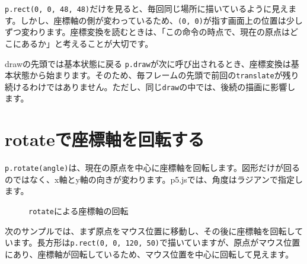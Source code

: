 \texttt{p.rect(0, 0, 48, 48)}だけを見ると、毎回同じ場所に描いているように見えます。しかし、座標軸の側が変わっているため、\texttt{(0, 0)}が指す画面上の位置は少しずつ変わります。座標変換を読むときは、「この命令の時点で、現在の原点はどこにあるか」と考えることが大切です。

\begin{notebox}{drawの先頭では基本状態に戻る}
\texttt{p.draw}が次に呼び出されるとき、座標変換は基本状態から始まります。そのため、毎フレームの先頭で前回の\texttt{translate}が残り続けるわけではありません。ただし、同じ\texttt{draw}の中では、後続の描画に影響します。
\end{notebox}

\section{rotateで座標軸を回転する}

\texttt{p.rotate(angle)}は、現在の原点を中心に座標軸を回転します。図形だけが回るのではなく、x軸とy軸の向きが変わります。p5.jsでは、角度はラジアンで指定します。

\begin{figure}[htbp]
    \centering
    \caption{\texttt{rotate}による座標軸の回転}
    \label{fig:chapter09-rotate-axis}
\end{figure}

次のサンプルでは、まず原点をマウス位置に移動し、その後に座標軸を回転しています。長方形は\texttt{p.rect(0, 0, 120, 50)}で描いていますが、原点がマウス位置にあり、座標軸が回転しているため、マウス位置を中心に回転して見えます。

\begin{listing}[htbp]
\inputminted{ts}{typescript-p5/listings/chapter09/rotating-rectangle-at-mouse.ts}
\caption{マウス位置を中心に長方形を回転させる（\texttt{chapter09/rotating-rectangle-at-mouse.ts}）}
\label{lst:chapter09-rotating-rectangle-at-mouse}
\end{listing}

